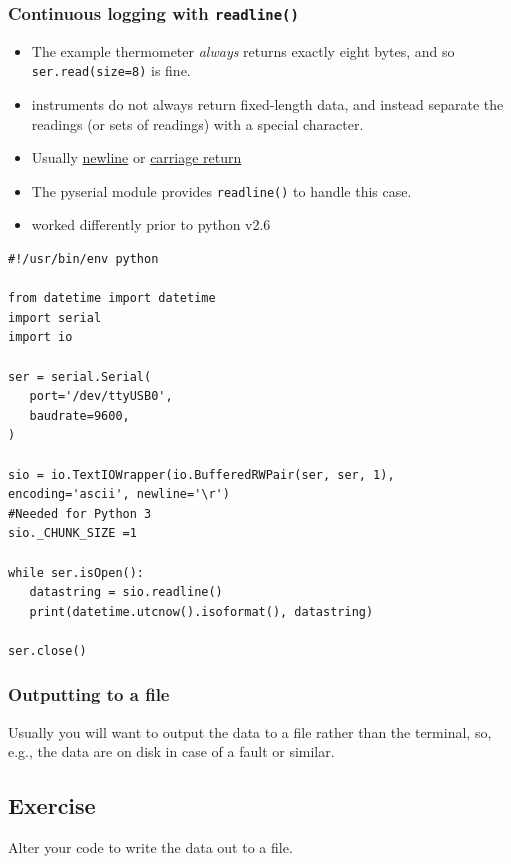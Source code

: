 \documentclass[aspectratio=1610,9pt]{beamer} %
\begin{document}
\begin{frame}[fragile]
\frametitle{Continuous logging with \texttt{readline()}}

\begin{itemize}
\itemsep1pt\parskip0pt
\item
  The example thermometer \emph{always} returns exactly eight bytes, and
  so \texttt{ser.read(size=8)} is fine.
\item
  instruments do not always return fixed-length data, and instead
  separate the readings (or sets of readings) with a special character.
\item
  Usually \href{http://en.wikipedia.org/wiki/Newline}{newline} or
  \href{http://en.wikipedia.org/wiki/Carriage_return}{carriage return}
\item
  The pyserial module provides \texttt{readline()} to handle this case.
\item
  worked differently prior to python v2.6
\end{itemize}
\end{frame}
\begin{frame}[fragile]

\begin{verbatim}
#!/usr/bin/env python

from datetime import datetime
import serial
import io

ser = serial.Serial(
   port='/dev/ttyUSB0',
   baudrate=9600,
)

sio = io.TextIOWrapper(io.BufferedRWPair(ser, ser, 1), encoding='ascii', newline='\r')
#Needed for Python 3
sio._CHUNK_SIZE =1

while ser.isOpen():
   datastring = sio.readline()
   print(datetime.utcnow().isoformat(), datastring)

ser.close()
\end{verbatim}

\end{frame}
\begin{frame}
\frametitle{Outputting to a file}

Usually you will want to output the data to a file rather than the
terminal, so, e.g., the data are on disk in case of a fault or similar.

\subsection{Exercise}

Alter your code to write the data out to a file.

\end{frame}
\end{document}
